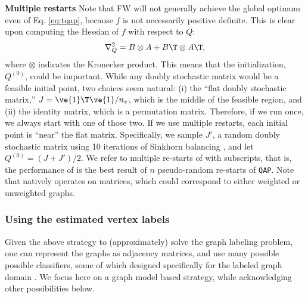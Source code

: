 \documentclass[10pt,journal,cspaper,compsoc]{IEEEtran}
\begin{document}
\textbf{Multiple restarts} Note that FW will not generally achieve the global optimum even of Eq. \eqref{eq:tqap}, because $f$ is not necessarily positive definite.  This is clear upon computing the Hessian of $f$  with respect to $Q$:
\begin{align}
	\nabla_Q^2  =  B \otimes A + B\T \otimes A\T,
\end{align}
where $\otimes$ indicates the Kronecker product. This means that the initialization, $Q^{(0)}$, could be important.  While any doubly stochastic matrix would be a feasible initial point, two choices seem natural: (i) the ``flat doubly  stochastic matrix,'' $J=\ve{1}\T \ve{1}/n_v$, which is the middle of the feasible region, and (ii) the identity matrix, which is a permutation matrix.  Therefore, if we run \qap  once, we always start with one of those two.  If we use multiple restarts, each initial point is ``near'' the flat matrix.  Specifically, we sample $J'$, a random doubly stochastic matrix using 10 iterations of Sinkhorn balancing \cite{Sinkhorn1964}, and let $Q^{(0)}=(J+J')/2$.  We refer to multiple re-starts of \qap with subscripts, that is, the performance of \qapn is the best result of $n$ pseudo-random re-starts of \texttt{QAP}.  Note that \qap natively operates on matrices, which could correspond to either weighted or unweighted graphs.



\subsubsection{Using the estimated vertex labels} %
\label{sec:algorithms}

Given the above strategy to (approximately) solve the graph labeling problem, one can represent the graphs as adjacency matrices, and use many possible possible classifiers, some of which designed specifically for the labeled graph domain \cite{Vogelstein2011}. We focus here on a graph model based strategy, while acknowledging other possibilities below.  


\end{document}
